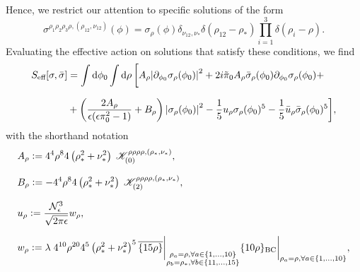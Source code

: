 \documentclass[11pt,a4paper]{article}
\newcommand{\defeq}{\vcentcolon=}
\begin{document}
Hence, we restrict our attention to specific solutions of the form
%
\begin{equation}
\sigma^{\rho_1 \rho_2 \rho_3 \rho,(\rho_{12},\nu_{12})}(\phi)
=
\sigma_{\rho}(\phi) \delta_{\nu_{12},\nu_*}\delta(\rho_{12}-\rho_*)\prod_{i=1}^3\delta(\rho_i-\rho).
\end{equation}
%
Evaluating the effective action on solutions that satisfy these conditions, we find
%
\begin{equation}\label{eq:action after isotropic restriction}
\begin{aligned}
S_{\text{eff}}[\sigma,\bar{\sigma}]
& =
\int\dd{\phi_0}\int\dd{\rho}\bigg{[} A_{\rho}\abs{\partial_{\phi_0}\sigma_{\rho}(\phi_0)}^2+2i\tilde{\pi}_0A_{\rho}\bar{\sigma}_{\rho}(\phi_0)\partial_{\phi_0}\sigma_{\rho}(\phi_0)+\\[7pt]
& +
\left(\frac{2A_{\rho}}{\epsilon(\epsilon\pi_0^2-1)}+B_{\rho}\right)\abs{\sigma_{\rho}(\phi_0)}^2-\frac{1}{5}u_{\rho}\sigma_{\rho}(\phi_0)^5-\frac{1}{5}\bar{u}_{\rho}\bar{\sigma}_{\rho}(\phi_0)^5 \bigg{]},
\end{aligned}
\end{equation}
%
with the shorthand notation 
%
\begin{align}
& A_{\rho} \defeq 4^4\rho^8 4\left(\rho_*^2+\nu_*^2\right)\;\mathscr{K}_{(0)}^{\rho\rho\rho\rho,(\rho_*,\nu_*)}\label{eq:definition of A},\\[7pt]
& B_{\rho} \defeq -4^4 \rho^8 4\left(\rho_*^2+\nu_*^2\right)\;\mathscr{K}_{(2)}^{\rho\rho\rho\rho,(\rho_*,\nu_*)},\label{eq:definition of B}\\[7pt]
& u_{\rho} \defeq \frac{\mathcal{N}_{\epsilon}^3}{\sqrt{2\pi\epsilon}}w_{\rho},\label{eq:definition of u}\\[7pt]
& w_{\rho} \defeq \lambda\; 4^{10}\rho^{20} 4^5\left(\rho_*^2+\nu_*^2\right)^5\overline{\{15\rho\}}\bigg{\vert}_{\substack{\rho_a = \rho,\forall a\in\{1,...,10\} \\ \rho_b = \rho_*, \forall b\in\{11,...,15\}}}\{10\rho\}_{\text{BC}}\bigg{\vert}_{\rho_a = \rho,\forall a\in\{1,...,10\}},\label{eq:definition of w}
\end{align}
%
\end{document}
